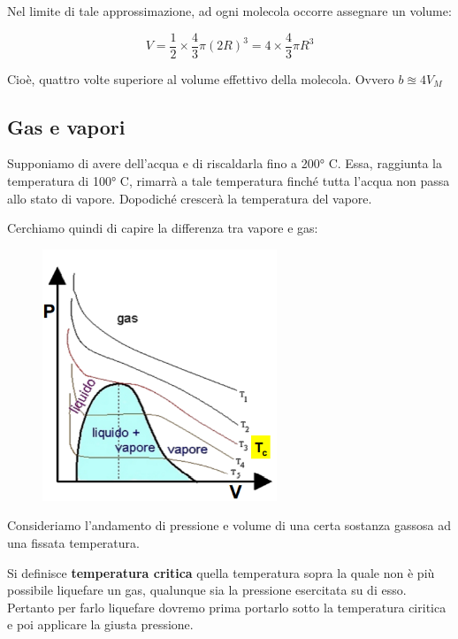 \vspace{0.2cm}Nel limite di tale approssimazione, ad ogni molecola occorre assegnare un volume:

$$V = \frac{1}{2} \times \frac{4}{3}\pi (2R)^3 = 4 \times \frac{4}{3}\pi R^3$$

Cioè, quattro volte superiore al volume effettivo della molecola. Ovvero $b \approxeq 4V_M$
\subsection{Gas e vapori}
Supponiamo di avere dell'acqua e di riscaldarla fino a 200° C. Essa, raggiunta la temperatura di 100° C, rimarrà a tale temperatura finché tutta l'acqua non passa allo stato di vapore. Dopodiché crescerà la temperatura del vapore.

Cerchiamo quindi di capire la differenza tra vapore e gas:

\vspace{-0.4cm}

\hspace{1cm}\begin{minipage}{0.53 \textwidth}
    \begin{figure}[H]
        \includegraphics[width=7cm]{immagini/grafico_pV.png}
    \end{figure}
\end{minipage}
\begin{minipage}{0.4 \textwidth}
\vspace{0.6cm}Consideriamo l'andamento di pressione e volume di una certa sostanza gassosa ad una fissata temperatura.

\vspace{0.2cm}Si definisce \textbf{temperatura critica} quella temperatura sopra la quale non è più possibile liquefare un gas, qualunque sia la pressione esercitata su di esso. Pertanto per farlo liquefare dovremo prima portarlo sotto la temperatura ciritica e poi applicare la giusta pressione.
\end{minipage}

